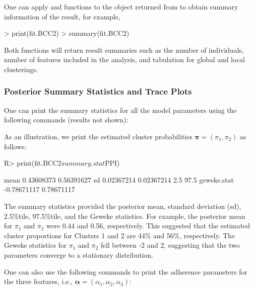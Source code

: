 One can apply  and  functions to the object returned from  to obtain summary information of the result, for example, 

\begin{example}
> print(fit.BCC2)
> summary(fit.BCC2)
\end{example} 

Both functions will return result summaries such as the number of individuals, number of features included in the analysis, and tabulation for global and local clusterings. 

\subsubsection{Posterior Summary Statistics and Trace Plots}

One can print the summary statistics for all the model parameters using the following commands (results not shown):


As an illustration, we print the estimated cluster probabilities $\boldsymbol{\pi} = (\pi_1, \pi_2)$ as follows: 

\begin{example}
R> print(fit.BCC2$summary.stat$PPI)
\end{example} 

\begin{example}
                   [,1]       [,2]
mean         0.43608373 0.56391627
sd           0.02367214 0.02367214
2.5%
97.5%
geweke.stat -0.78671117 0.78671117
\end{example}

The summary statistics provided the posterior mean, standard deviation (sd), 2.5\%tile, 97.5\%tile, and the Geweke statistics. For example, the posterior mean for $\pi_1$ and $\pi_2$ were 0.44 and 0.56, respectively. This suggested that the estimated cluster proportions for Clusters 1 and 2 are 44\% and 56\%, respectively. The Geweke statistics for $\pi_1$ and $\pi_2$ fell between -2 and 2, suggesting that the two parameters converge to a stationary distribution. 

One can also use the following commands to print the adherence parameters for the three features, i.e., $\boldsymbol{\alpha}=(\alpha_1,\alpha_2,\alpha_3)$:

